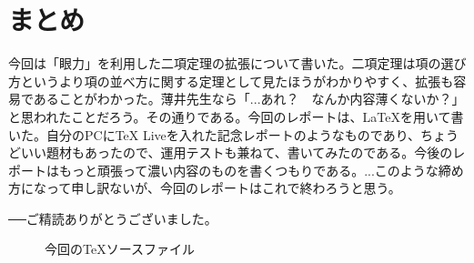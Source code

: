 \documentclass[dvipdfmx]{jlreq}
\begin{document}
\section{まとめ}
今回は「眼力」を利用した二項定理の拡張について書いた。二項定理は項の選び方というより項の並べ方に関する定理として見たほうがわかりやすく、拡張も容易であることがわかった。薄井先生なら「...あれ？　なんか内容薄くないか？」と思われたことだろう。その通りである。今回のレポートは、\LaTeX を用いて書いた。自分のPCに\TeX{} Liveを入れた記念レポートのようなものであり、ちょうどいい題材もあったので、運用テストも兼ねて、書いてみたのである。今後のレポートはもっと頑張って濃い内容のものを書くつもりである。...このような締め方になって申し訳ないが、今回のレポートはこれで終わろうと思う。

──ご精読ありがとうございました。
\begin{figure}[htbp]
  \centering
  \vspace{1cm}
  \caption*{今回の\TeX ソースファイル}
\end{figure}
\end{document}
